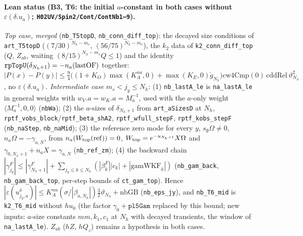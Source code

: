 \documentclass[11pt]{amsart}
\theoremstyle{definition}
\theoremstyle{remark}
\numberwithin{equation}{section}
\begin{document}
\paragraph{Lean status (B3, T6: the initial $a$-constant in both cases without $\varepsilon(\delta.u_a)$; \texttt{H02UV/Spin2/Cont/ContNb1--9}).}
\emph{Top case, merged} (\texttt{nb\_T5topD}, \texttt{nb\_conn\_diff\_top}): the decayed size conditions of
\texttt{art\_T5topD} ($(7/30)^{N_h-m_s}$, $(56/75)^{N_h-m_s}$), the $k_2$ data of \texttt{k2\_conn\_diff\_top}
($Q$, $Z_{ab}$, waiting $(8/15)^{N_h-m_s}Q\le1$) and the identity $\texttt{rpTopU}(\delta_{N_h+1})=-n_a({\rm lastOF})$
together: $|P(x)-P(y)|\le\tfrac94\bigl((1+K_O)\max(K_A^{na},0)+\max(K_E,0)\check g_{N_h}\bigr)\mathrm{cw4Cmp}(0)\,
\mathrm{cddRel}\,\vartheta_{N_h}^2$, no $\varepsilon(\delta.u_a)$. \emph{Intermediate case} $m_s<j_y\le N_h$:
(1) \texttt{nb\_lastA\_le} is \texttt{na\_lastA\_le} in general weights with $w_V.a=w_K.a=M_a^{-1}$, used with the
$a$-only weight $\langle M_a^{-1},0,0\rangle$ (\texttt{nbWa}); (2) the $a$-sizes of $\delta_{N_h+1}$ from
\texttt{art\_aSizesD} at $N_h$, \texttt{rptf\_vobs\_block}/\texttt{rptf\_beta\_shA2}, \texttt{rptf\_wfull\_stepF},
\texttt{rptf\_kobs\_stepF} (\texttt{nb\_naStep}, \texttt{nb\_naMid}); (3) the reference zero mode for every $y$,
$s_\emptyset\Omega\neq0$, $n_a\Omega=-\gamma_{a,N}$, from $n_a(W_{\rm top}({\rm ref}))=0$, $W_{\rm top}=e^{-u_{N_h+1}}X\Omega$
and $\gamma_{0,N_h+1}+n_aX=\gamma_{a,N}$ (\texttt{nb\_ref\_zm}); (4) the backward chain
$|\gamma^F_{j_y}|\le|\gamma^F_{N_h+1}|+\sum_{j_y\le k\le N_h}(|\beta^F_k||c_k|+|\mathrm{gamWKF}_k|)$ (\texttt{nb\_gam\_back},
\texttt{nb\_gam\_back\_top}, per-step bounds of \texttt{ct\_gam\_top}). Hence
$|\varepsilon(u^\delta_{j_y,a})|\le K_A^{na}(\sigma/|\beta_{a,N_h}|)\tfrac32\vartheta_{N_h}+\mathrm{nbGB}$
(\texttt{nb\_eps\_jy}), and \texttt{nb\_T6\_mid} is \texttt{k2\_T6\_mid} without $hu_0$ (the factor
$\gamma_0+\texttt{pl5Gam}$ replaced by this bound; new inputs: $a$-size constants $mm,k_1,c_1$ at $N_h$ with decayed
transients, the window of \texttt{na\_lastA\_le}). $Z_{ab}$ ($hZ$, $hQ_z$) remains a hypothesis in both cases.
\end{document}
